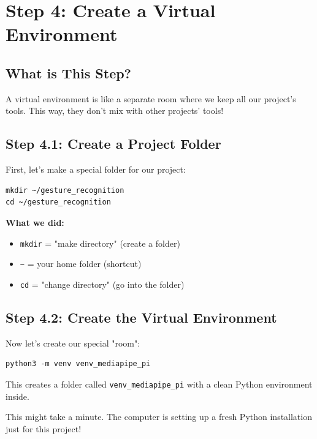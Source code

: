 \documentclass[12pt,a4paper]{article}
\begin{document}
\section{Step 4: Create a Virtual Environment}

\subsection{What is This Step?}

A virtual environment is like a separate room where we keep all our project's tools. This way, they don't mix with other projects' tools!

\subsection{Step 4.1: Create a Project Folder}

First, let's make a special folder for our project:

\begin{lstlisting}
mkdir ~/gesture_recognition
cd ~/gesture_recognition
\end{lstlisting}

\begin{infobox}
\textbf{What we did:}
\begin{itemize}
    \item \texttt{mkdir} = "make directory" (create a folder)
    \item \texttt{\~} = your home folder (shortcut)
    \item \texttt{cd} = "change directory" (go into the folder)
\end{itemize}
\end{infobox}

\subsection{Step 4.2: Create the Virtual Environment}

Now let's create our special "room":

\begin{lstlisting}
python3 -m venv venv_mediapipe_pi
\end{lstlisting}

This creates a folder called \texttt{venv\_mediapipe\_pi} with a clean Python environment inside.

\begin{tipbox}
This might take a minute. The computer is setting up a fresh Python installation just for this project!
\end{tipbox}
\end{document}
